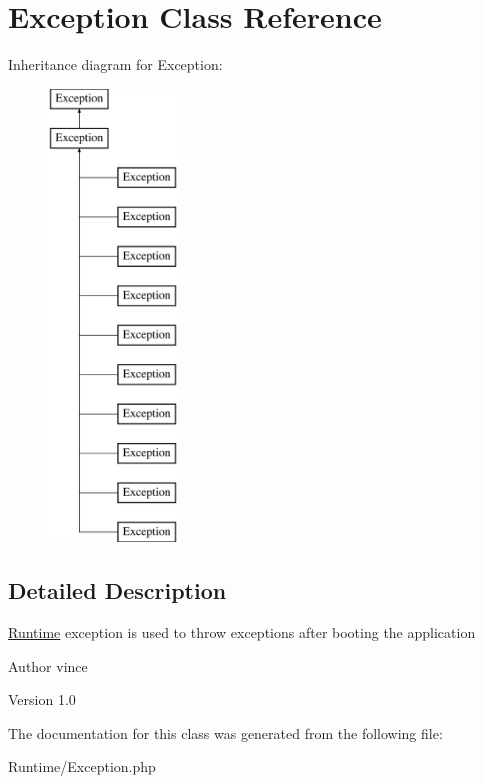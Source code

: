 \hypertarget{class_anemo_1_1_runtime_1_1_exception}{
\section{Exception Class Reference}
\label{class_anemo_1_1_runtime_1_1_exception}
}
Inheritance diagram for Exception:\begin{figure}[H]
\begin{center}
\leavevmode
\includegraphics[height=12.000000cm]{class_anemo_1_1_runtime_1_1_exception}
\end{center}
\end{figure}


\subsection{Detailed Description}
\hyperlink{namespace_anemo_1_1_runtime}{Runtime} exception is used to throw exceptions after booting the application \begin{DoxyAuthor}{Author}
vince 
\end{DoxyAuthor}
\begin{DoxyVersion}{Version}
1.0 
\end{DoxyVersion}


The documentation for this class was generated from the following file:\begin{DoxyCompactItemize}
\item 
Runtime/Exception.php\end{DoxyCompactItemize}
